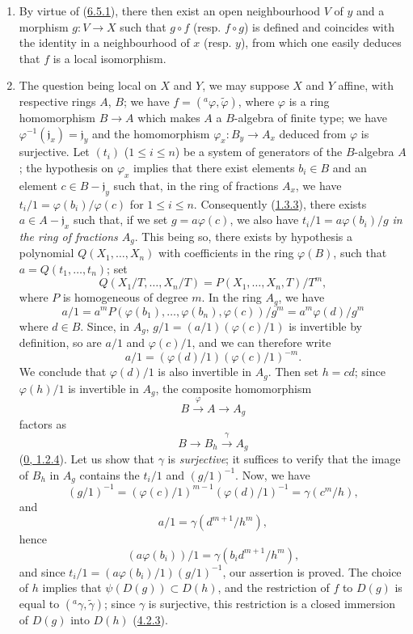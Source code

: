 \begin{enumerate}
  \item[(ii)] By virtue of (\hyperref[I.6.5.1]{6.5.1}), there then exist an
    open neighbourhood $V$ of $y$ and a morphism $g:V\to X$ such that
    $g\circ f$ (resp. $f\circ g$) is defined and coincides with the identity in
    a neighbourhood of $x$ (resp. $y$), from which one easily deduces that $f$
    is a local isomorphism.
  \item[(i)] The question being local on $X$ and $Y$, we may suppose $X$ and
    $Y$ affine, with respective rings $A$, $B$; we have
    $f=({}^a\varphi,\widetilde{\varphi})$, where $\varphi$ is a ring
    homomorphism $B\to A$ which makes $A$ a $B$-algebra of finite type; we have
    $\varphi^{-1}(\mathfrak{j}_x)=\mathfrak{j}_y$ and the homomorphism
    $\varphi_x:B_y\to A_x$ deduced from $\varphi$ is surjective. Let $(t_i)$
    ($1\leq i\leq n$) be a system of generators of the $B$-algebra $A$;
    the hypothesis on $\varphi_x$ implies that there exist elements $b_i\in B$
    and an element $c\in B-\mathfrak{j}_y$ such that, in the ring of fractions
    $A_x$, we have $t_i/1=\varphi(b_i)/\varphi(c)$ for $1\leq i\leq n$.
    Consequently (\hyperref[I.1.3.3]{1.3.3}), there exists
    $a\in A-\mathfrak{j}_x$ such that, if we set $g=a\varphi(c)$, we also have
    $t_i/1=a\varphi(b_i)/g$ \emph{in the ring of fractions $A_g$}. This being
    so, there exists by hypothesis a polynomial $Q(X_1,\ldots,X_n)$ with
    coefficients in the ring $\varphi(B)$,
    such that $a=Q(t_1,\ldots,t_n)$; set
    \[
      Q(X_1/T,\ldots,X_n/T)
      =P(X_1,\ldots,X_n,T)/T^m,
    \]
    where $P$ is homogeneous of degree $m$. In the ring $A_g$, we have
    \[
      a/1
      =a^mP(\varphi(b_1),\ldots,\varphi(b_n),\varphi(c))/g^m
      =a^m\varphi(d)/g^m
    \]
    where $d\in B$. Since, in $A_g$,
    $g/1=(a/1)(\varphi(c)/1)$ is invertible by definition, so are $a/1$ and
    $\varphi(c)/1$, and we can therefore write
    \[
      a/1=(\varphi(d)/1)(\varphi(c)/1)^{-m}.
    \]
    We conclude that $\varphi(d)/1$ is also invertible in $A_g$. Then set
    $h=cd$; since $\varphi(h)/1$ is invertible in $A_g$,
    the composite homomorphism
    \[
      B\xrightarrow{\varphi}A\longrightarrow A_g
    \]
    factors as
    \[
      B\longrightarrow B_h\xrightarrow{\gamma}A_g
    \]
    (\hyperref[0.1.2.4]{0, 1.2.4}). Let us show that $\gamma$ is
    \emph{surjective}; it suffices to verify that the image of $B_h$ in $A_g$
    contains the $t_i/1$ and $(g/1)^{-1}$. Now, we have
    \[
      (g/1)^{-1}
      =(\varphi(c)/1)^{m-1}(\varphi(d)/1)^{-1}
      =\gamma(c^m/h),
    \]
    and
    \[
      a/1=\gamma(d^{m+1}/h^m),
    \]
    hence
    \[
      (a\varphi(b_i))/1=\gamma(b_i d^{m+1}/h^m),
    \]
    and since
    $t_i/1=(a\varphi(b_i)/1)(g/1)^{-1}$, our assertion is proved. The
    choice of $h$ implies that $\psi(D(g))\subset D(h)$, and the restriction of
    $f$ to $D(g)$ is equal to
    $({}^a\gamma,\widetilde{\gamma})$; since $\gamma$ is surjective, this
    restriction is a closed immersion of $D(g)$ into $D(h)$
    (\hyperref[I.4.2.3]{4.2.3}).
\end{enumerate}

